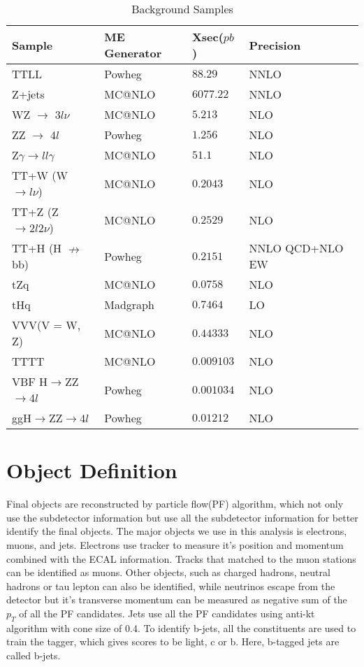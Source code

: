 \documentclass[
12pt, %
a4paper, %
oneside, %
headinclude,footinclude, %
BCOR5mm, %
]{scrartcl}
\begin{document}
\begin{table}[hbt]
    \caption{Background Samples}
    \centering
    \begin{tabular}{llll}
        \toprule
        Sample  & ME Generator    & Xsec($pb$)    & Precision \\
        \midrule
        TTLL & Powheg & $88.29$ & NNLO \\
        Z+jets & MC@NLO & $6077.22$ & NNLO \\
        WZ $\rightarrow$ 3$l\nu$ & MC@NLO & $5.213$ & NLO \\
        ZZ $\rightarrow$ 4$l$ & Powheg & $1.256$ & NLO \\
        Z$\gamma \rightarrow ll\gamma$ & MC@NLO & $51.1$ & NLO \\
        TT+W (W $\rightarrow l\nu$) & MC@NLO & $0.2043$ & NLO \\
        TT+Z (Z $\rightarrow 2l2\nu$) & MC@NLO & $0.2529$ & NLO \\
        TT+H (H $\nrightarrow$ bb) & Powheg & $0.2151$ & NNLO QCD+NLO EW \\
        tZq & MC@NLO & $0.0758$ & NLO \\
        tHq & Madgraph & $0.7464$ & LO \\
        VVV(V = W, Z) & MC@NLO & $0.44333$ & NLO \\
        TTTT & MC@NLO & $0.009103$ & NLO \\
        VBF H$\rightarrow$ZZ$\rightarrow$4$l$ & Powheg & $0.001034$ & NLO \\
        ggH$\rightarrow$ZZ$\rightarrow$4$l$ & Powheg & $0.01212$ & NLO \\
        \bottomrule
    \end{tabular}
    \label{tab:label}
\end{table}

\section{Object Definition}
Final objects are reconstructed by particle flow(PF) algorithm, which not only use the subdetector
information but use all the subdetector information for better identify the final objects.
The major objects we use in this analysis is electrons, muons, and jets. Electrons use tracker to measure
it's position and momentum combined with the ECAL information. Tracks that matched to the muon stations
can be identified as muons. Other objects, such as charged hadrons, neutral hadrons or tau lepton can also be identified,
while neutrinos escape from the detector but it's transverse momentum can be measured as negative sum of the $p_{T}$ of all the
PF candidates. Jets use all the PF candidates using anti-kt algorithm with cone size of 0.4.
To identify b-jets, all the constituents are used to train the tagger, which gives scores to be light, c or b.
Here, b-tagged jets are called b-jets.
\end{document}
